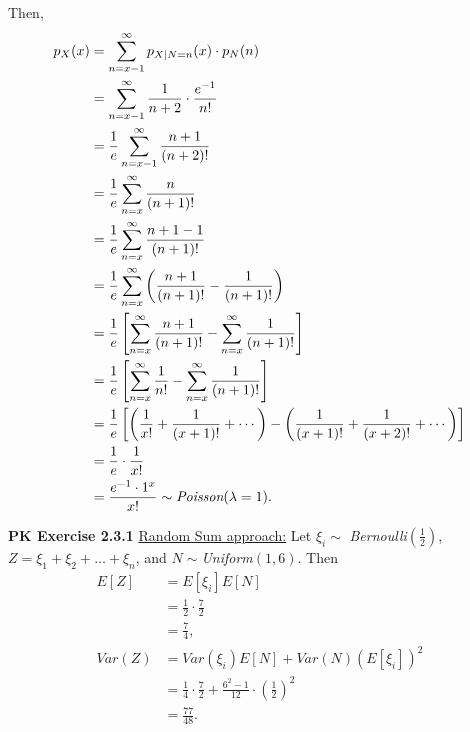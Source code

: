 \documentclass{article}
\begin{document}
Then, 
\begin{align}
    p_X(x) & = \sum_{n=x-1}^{\infty}p_{X|N=n}(x)\cdot p_N(n) \nonumber \\
    & = \sum_{n=x-1}^{\infty}\frac{1}{n+2} \cdot \frac{e^{-1}}{n!} \nonumber \\
    & = \frac{1}{e}\sum_{n=x-1}^{\infty}\frac{n+1}{(n+2)!} \nonumber \\
    & = \frac{1}{e}\sum_{n=x}^{\infty}\frac{n}{(n+1)!} \nonumber \\
    & = \frac{1}{e}\sum_{n=x}^{\infty}\frac{n+1-1}{(n+1)!} \nonumber \\
    & = \frac{1}{e}\sum_{n=x}^{\infty}\left(\frac{n+1}{(n+1)!} - \frac{1}{(n+1)!}\right) \nonumber \\
    & = \frac{1}{e}\left[\sum_{n=x}^{\infty}\frac{n+1}{(n+1)!} - \sum_{n=x}^{\infty}\frac{1}{(n+1)!}\right] \nonumber \\
    & = \frac{1}{e}\left[\sum_{n=x}^{\infty}\frac{1}{n!} - \sum_{n=x}^{\infty}\frac{1}{(n+1)!}\right] \nonumber \\
    & = \frac{1}{e}\left[\left(\frac{1}{x!} + \frac{1}{(x+1)!} + \cdots\right) - \left(\frac{1}{(x+1)!} + \frac{1}{(x+2)!} + \cdots\right)\right] \nonumber \\
    & = \frac{1}{e}\cdot \frac{1}{x!} \nonumber \\
    & = \frac{e^{-1}\cdot 1^{x}}{x!} \sim \emph{Poisson}(\lambda = 1). \nonumber
\end{align}
\bigbreak

\textbf{PK Exercise 2.3.1} 
\underline{Random Sum approach:} Let $\xi_i \sim$ \emph{Bernoulli}$(\frac{1}{2})$, $Z = \xi_1 + \xi_2 + \dots + \xi_n$, and $N \sim $\emph{Uniform}$(1,6)$.
Then 
\begin{align}
    E[Z] & = E[\xi_i]E[N] \nonumber \\
    & = \frac{1}{2}\cdot\frac{7}{2}\nonumber \\
    & =\frac{7}{4}, \nonumber \\
    Var(Z) & = Var(\xi_i)E[N] + Var(N)(E[\xi_i])^2 \nonumber \\
    & = \frac{1}{4}\cdot\frac{7}{2} + \frac{6^2-1}{12}\cdot\left(\frac{1}{2}\right)^2 \nonumber \\
    & = \frac{77}{48}. \nonumber
\end{align}
\end{document}
